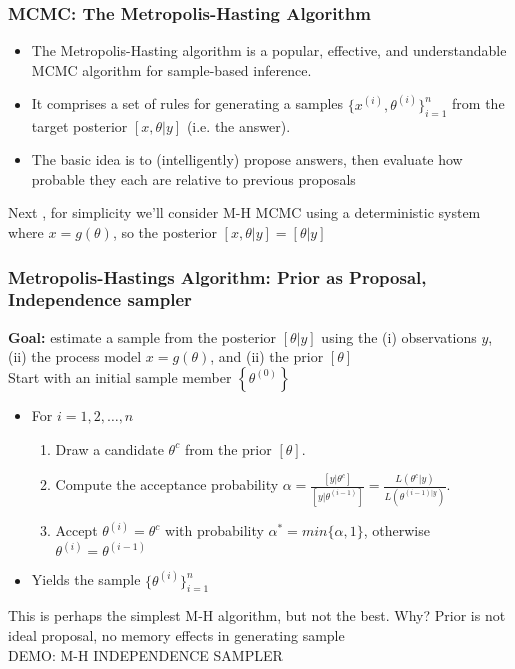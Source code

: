 \documentclass{beamer}
\begin{document}
\frame%
{\frametitle{MCMC: The Metropolis-Hasting Algorithm}

\begin{itemize}
\item
The Metropolis-Hasting algorithm is a popular, effective,  and understandable MCMC algorithm for sample-based inference.

\item 
It comprises a set of rules for generating a samples $\{ x^{(i)}, \theta^{(i)} \}_{i=1}^n$ from the target posterior $[x, \theta | y]$ (i.e. the answer).

\item
The basic idea is to (intelligently) propose answers, then evaluate how probable they each are relative to previous proposals

\end{itemize}


Next , for simplicity we'll consider M-H MCMC using a deterministic system where $x = g(\theta)$, so the posterior $ [x,\theta | y] = [\theta | y]$
}

\frame
{ \frametitle{Metropolis-Hastings Algorithm: Prior as Proposal, Independence sampler}

\small 
\textbf{Goal:} estimate a sample from the posterior $[\theta | y]$ using the (i) observations $y$, (ii) the process model $x = g(\theta)$, and (ii) the prior $[ \theta ]$ \\ 
Start with an initial sample member $\left \lbrace  \theta^{(0)}  \right \rbrace $ 
\begin{itemize}	
		\item For $i=1,2,\dots,n$
		\begin{enumerate}
			\item Draw a candidate $\theta^c$ from the prior $ [\theta] $.
			\item Compute the acceptance probability $\alpha= \frac{[y|\theta^c]}{[y|\theta^{(i-1)}]} = \frac{L(\theta^c | y)}{L(\theta^{(i-1) | y})}$. 
			\item Accept $\theta^{(i)} = \theta^c$ with probability $\alpha^*=min\{\alpha,1\}$, otherwise $\theta^{(i)} = \theta^{(i-1)}$
		\end{enumerate} 
		\item Yields the sample $ \{ \theta^{(i)} \}_{i=1}^n $ 
\end{itemize}

This is perhaps the simplest M-H algorithm, but not the best. Why? Prior is not ideal proposal, no memory effects in generating sample \\
\medskip
\color{red} DEMO: M-H INDEPENDENCE SAMPLER 

}
\end{document}
